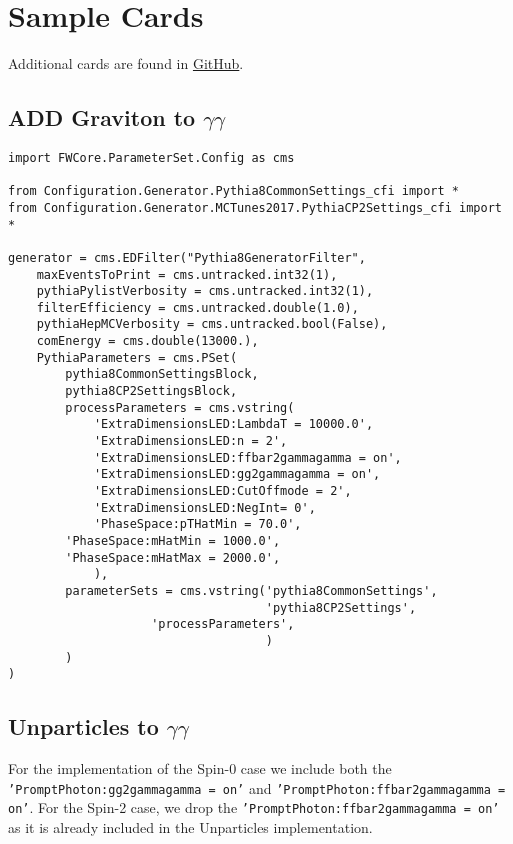 \chapter{Sample Cards}\label{ch:appendix_sample_cards}

Additional cards are found in \href{https://github.com/uzzielperez/Analyses/tree/master/Analysis_v1/Simulation/Pythia}{GitHub}.



\section{ADD Graviton to $\gamma\gamma$}

\begin{verbatim}
import FWCore.ParameterSet.Config as cms 

from Configuration.Generator.Pythia8CommonSettings_cfi import *
from Configuration.Generator.MCTunes2017.PythiaCP2Settings_cfi import *

generator = cms.EDFilter("Pythia8GeneratorFilter",
    maxEventsToPrint = cms.untracked.int32(1),
    pythiaPylistVerbosity = cms.untracked.int32(1),
    filterEfficiency = cms.untracked.double(1.0),
    pythiaHepMCVerbosity = cms.untracked.bool(False),
    comEnergy = cms.double(13000.),
    PythiaParameters = cms.PSet(
        pythia8CommonSettingsBlock,
        pythia8CP2SettingsBlock,
        processParameters = cms.vstring(
            'ExtraDimensionsLED:LambdaT = 10000.0',
            'ExtraDimensionsLED:n = 2',
            'ExtraDimensionsLED:ffbar2gammagamma = on',
            'ExtraDimensionsLED:gg2gammagamma = on',
            'ExtraDimensionsLED:CutOffmode = 2', 
            'ExtraDimensionsLED:NegInt= 0',
            'PhaseSpace:pTHatMin = 70.0',
	    'PhaseSpace:mHatMin = 1000.0',	    
	    'PhaseSpace:mHatMax = 2000.0', 
            ),  
        parameterSets = cms.vstring('pythia8CommonSettings',
                                    'pythia8CP2Settings', 
				    'processParameters',
                                    )   
        )   
)
\end{verbatim}


\section{Unparticles to $\gamma\gamma$}

For the \PYTHIA implementation of the Spin-0 case we include both the \texttt{'PromptPhoton:gg2gammagamma = on'} and \texttt{'PromptPhoton:ffbar2gammagamma = on'}. For the Spin-2 case, we drop the  \texttt{'PromptPhoton:ffbar2gammagamma = on'} as it is already included in the Unparticles implementation.

